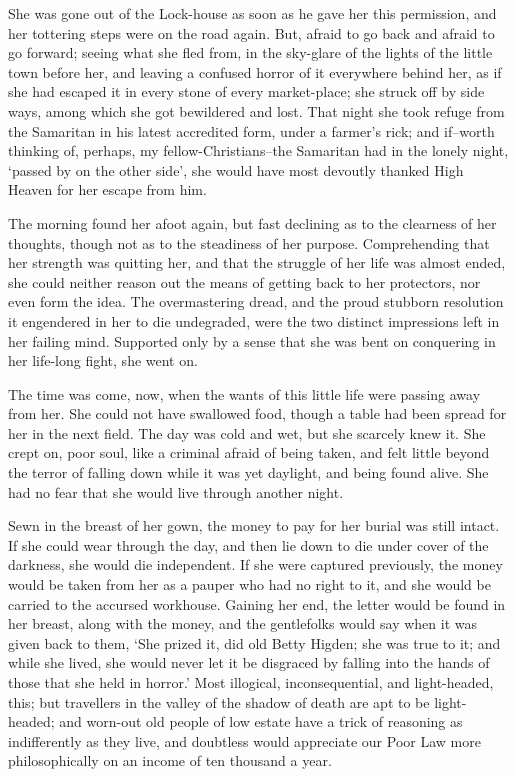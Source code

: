 She was gone out of the Lock-house as soon as he gave her this
permission, and her tottering steps were on the road again. But, afraid
to go back and afraid to go forward; seeing what she fled from, in the
sky-glare of the lights of the little town before her, and leaving a
confused horror of it everywhere behind her, as if she had escaped it
in every stone of every market-place; she struck off by side ways, among
which she got bewildered and lost. That night she took refuge from the
Samaritan in his latest accredited form, under a farmer’s rick; and
if--worth thinking of, perhaps, my fellow-Christians--the Samaritan had
in the lonely night, ‘passed by on the other side’, she would have most
devoutly thanked High Heaven for her escape from him.

The morning found her afoot again, but fast declining as to the
clearness of her thoughts, though not as to the steadiness of her
purpose. Comprehending that her strength was quitting her, and that the
struggle of her life was almost ended, she could neither reason out the
means of getting back to her protectors, nor even form the idea. The
overmastering dread, and the proud stubborn resolution it engendered
in her to die undegraded, were the two distinct impressions left in her
failing mind. Supported only by a sense that she was bent on conquering
in her life-long fight, she went on.

The time was come, now, when the wants of this little life were passing
away from her. She could not have swallowed food, though a table had
been spread for her in the next field. The day was cold and wet, but
she scarcely knew it. She crept on, poor soul, like a criminal afraid of
being taken, and felt little beyond the terror of falling down while it
was yet daylight, and being found alive. She had no fear that she would
live through another night.

Sewn in the breast of her gown, the money to pay for her burial was
still intact. If she could wear through the day, and then lie down to
die under cover of the darkness, she would die independent. If she were
captured previously, the money would be taken from her as a pauper who
had no right to it, and she would be carried to the accursed workhouse.
Gaining her end, the letter would be found in her breast, along with
the money, and the gentlefolks would say when it was given back to them,
‘She prized it, did old Betty Higden; she was true to it; and while she
lived, she would never let it be disgraced by falling into the hands
of those that she held in horror.’ Most illogical, inconsequential, and
light-headed, this; but travellers in the valley of the shadow of death
are apt to be light-headed; and worn-out old people of low estate have
a trick of reasoning as indifferently as they live, and doubtless
would appreciate our Poor Law more philosophically on an income of ten
thousand a year.


